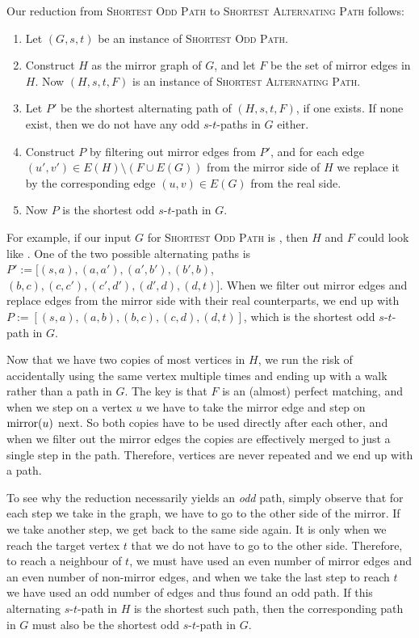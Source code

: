 Our reduction from \textsc{Shortest Odd Path} to \textsc{Shortest Alternating Path} follows:
\begin{enumerate}
    \item Let $(G, s, t)$ be an instance of \textsc{Shortest Odd Path}.
    \item Construct $H$ as the mirror graph of $G$, and let $F$ be the set of mirror edges in $H$. Now $(H, s, t, F)$ is an instance of \textsc{Shortest Alternating Path}.
    \item Let $P'$ be the shortest alternating path of $(H, s, t, F)$, if one exists. If none exist, then we do not have any odd $s$-$t$-paths in $G$ either.
    \item Construct $P$ by filtering out mirror edges from $P'$, and for each edge $(u',v') \in E(H) \setminus (F \cup E(G))$ from the mirror side of $H$ we replace it by the corresponding edge $(u,v) \in E(G)$ from the real side.
    \label{point:translate_alternating_path}
    \item Now $P$ is the shortest odd $s$-$t$-path in $G$.
\end{enumerate}

For example, if our input $G$ for \textsc{Shortest Odd Path} is , then $H$ and $F$ could look like . One of the two possible alternating paths is $P' := [(s,a), (a, a'), (a',b'), (b',b)$, $(b,c), (c,c'), (c',d'), (d',d), (d,t)]$. When we filter out mirror edges and replace edges from the mirror side with their real counterparts, we end up with $P := [(s,a),(a,b),(b,c),(c,d),(d,t)]$, which is the shortest odd $s$-$t$-path in $G$. 

Now that we have two copies of most vertices in $H$, we run the risk of accidentally using the same vertex multiple times and ending up with a walk rather than a path in $G$. The key is that $F$ is an (almost) perfect matching, and when we step on a vertex $u$ we have to take the mirror edge and step on $\operatorname{mirror}(u)$ next. So both copies have to be used directly after each other, and when we filter out the mirror edges the copies are effectively merged to just a single step in the path. Therefore, vertices are never repeated and we end up with a path.

To see why the reduction necessarily yields an \emph{odd} path, simply observe that for each step we take in the graph, we have to go to the other side of the mirror. If we take another step, we get back to the same side again. It is only when we reach the target vertex $t$ that we do not have to go to the other side. Therefore, to reach a neighbour of $t$, we must have used an even number of mirror edges and an even number of non-mirror edges, and when we take the last step to reach $t$ we have used an odd number of edges and thus found an odd path. If this alternating $s$-$t$-path in $H$ is the shortest such path, then the corresponding path in $G$ must also be the shortest odd $s$-$t$-path in $G$. 

